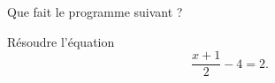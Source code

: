 
\begin{exercice}\label{exosmath-0002}

    Que fait le programme suivant ?
    


Résoudre l'équation 
\begin{equation}
    \frac{ x+1 }{2}-4=2.
\end{equation}

\end{exercice}
